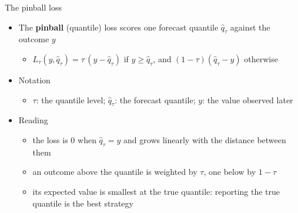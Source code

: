 \begin{frame}{The pinball loss}
\itemsize{\small}
\begin{itemize}
    \item The \textbf{pinball} (quantile) loss scores one forecast quantile $\hat q_\tau$ against the outcome $y$
    \begin{itemize}
        \item $L_\tau(y, \hat q_\tau) = \tau\,(y - \hat q_\tau)$ if $y \ge \hat q_\tau$, and $(1 - \tau)(\hat q_\tau - y)$ otherwise
    \end{itemize}
    \item Notation
    \begin{itemize}
        \item $\tau$: the quantile level; $\hat q_\tau$: the forecast quantile; $y$: the value observed later
    \end{itemize}
    \item Reading
    \begin{itemize}
        \item the loss is 0 when $\hat q_\tau = y$ and grows linearly with the distance between them
        \item an outcome above the quantile is weighted by $\tau$, one below by $1 - \tau$
        \item its expected value is smallest at the true quantile: reporting the true quantile is the best strategy
    \end{itemize}
\end{itemize}
\end{frame}

